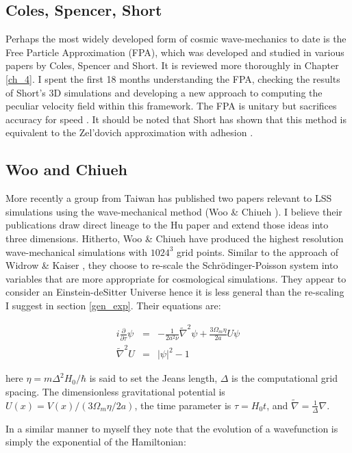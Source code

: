 \subsection{Coles, Spencer, Short}
Perhaps the most widely developed form of cosmic wave-mechanics to date is the Free Particle Approximation (FPA), which was developed and studied in various papers by Coles, Spencer and Short. It is reviewed more thoroughly in Chapter \ref{ch_4}. I spent the first 18 months understanding the FPA, checking the results of Short's 3D simulations and developing a new approach to computing the peculiar velocity field within this framework. The FPA is unitary but sacrifices accuracy for speed \citep{bib_col, bib_spe, bib_sho, bib_sho2, bib_short}. It should be noted that Short has shown that this method is equivalent to the Zel'dovich approximation with adhesion \citep{bib_short}.

\subsection{Woo and Chiueh}
More recently a group from Taiwan has published two papers relevant to LSS simulations using the wave-mechanical method (Woo \& Chiueh \citep{bib_woo, bib_wooc}). I believe their publications draw direct lineage to the Hu paper and extend those ideas into three dimensions. Hitherto, Woo \& Chiueh have produced the highest resolution wave-mechanical simulations with $1024^3$ grid points. Similar to the approach of Widrow \& Kaiser \citep{bib_wk}, they choose to re-scale the Schr\"odinger-Poisson system into variables that are more appropriate for cosmological simulations. They appear to consider an Einstein-deSitter Universe hence it is less general than the re-scaling I suggest in section \ref{gen_exp}. Their equations are:

\begin{eqnarray}
i \frac{\partial}{\partial \tau}\psi &=& -\frac{1}{2a^2\nu}\tilde{\nabla}^2\psi + \frac{3\Omega_m\eta}{2a} U \psi \\
\tilde{\nabla}^2 U &=& |\psi|^2 - 1
\end{eqnarray}

\noindent here $\eta = m\Delta^2 H_0/\hbar$ is said to set the Jeans length, $\Delta$ is the computational grid spacing. The dimensionless gravitational potential is $U(x) = V(x)/(3\Omega_m\eta/2a)$, the time parameter is $\tau = H_0 t$, and $\tilde{\nabla} = \frac{1}{\Delta}\nabla$.

In a similar manner to myself they note that the evolution of a wavefunction is simply the exponential of the Hamiltonian:

